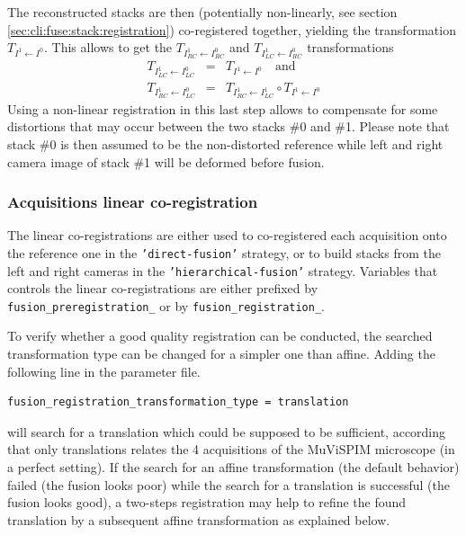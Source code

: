 The reconstructed stacks are then (potentially non-linearly, see section \ref{sec:cli:fuse:stack:registration}) co-registered together, yielding the transformation $T_{I^{1} \leftarrow I^{0}}$. This allows to get the 
$T_{I^{1}_{RC} \leftarrow I^{0}_{RC}}$ and
$T_{I^{1}_{LC} \leftarrow I^{0}_{RC}}$ transformations 
\begin{eqnarray*}
T_{I^{1}_{LC} \leftarrow I^{0}_{LC}} & = & T_{I^{1} \leftarrow I^{0}} \quad \textrm{and} \\
T_{I^{1}_{RC} \leftarrow I^{0}_{LC}} & = &
T_{I^{1}_{RC} \leftarrow I^{1}_{LC}} \circ T_{I^{1} \leftarrow I^{0}}                      
\end{eqnarray*}
Using a non-linear registration in this last step allows to compensate for some distortions that may occur between the two stacks \#0 and \#1. Please note that stack \#0 is then assumed to be the non-distorted reference while left and right camera image of stack \#1 will be deformed before fusion.


\subsubsection{Acquisitions linear co-registration}
\label{sec:cli:fuse:acquisition:registration}
The linear co-registrations are either used to co-registered each acquisition onto the reference one in the \texttt{'direct-fusion'} strategy, or to build stacks from the left and right cameras in the \texttt{'hierarchical-fusion'} strategy.
Variables that controls the linear co-registrations are either prefixed by \texttt{fusion\_preregistration\_} or by \texttt{fusion\_registration\_}.

To verify whether a good quality registration can be conducted, the searched transformation type can be changed for a simpler one than affine. 
Adding the following line in the parameter file.
\begin{verbatim}
fusion_registration_transformation_type = translation
\end{verbatim}
will search for a translation which could be supposed to be sufficient, according that only translations relates the 4 acquisitions of the MuViSPIM microscope (in a perfect setting). If the search for an affine transformation (the default behavior) failed (the fusion looks poor) while the search for a translation is successful (the fusion looks good), a two-steps registration may help to refine the found translation by a subsequent affine transformation as explained below.

